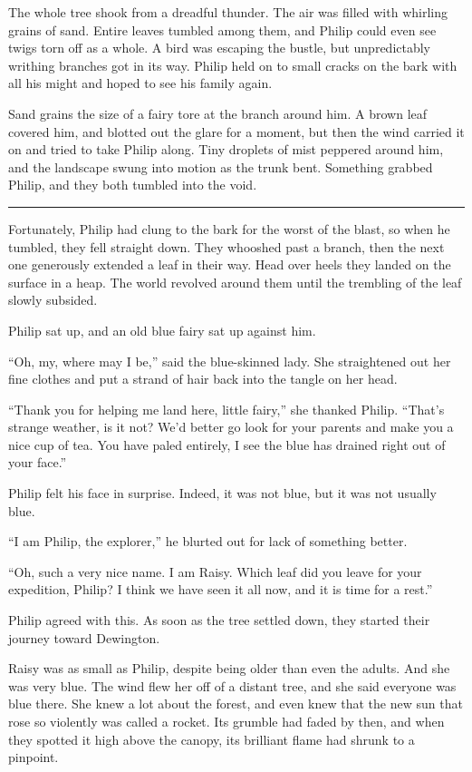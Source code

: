 \documentclass[10pt]{memoir}
\renewcommand{\pfbreakdisplay}{\bigskip \ding{166} \bigskip}
\newcommand{\secbreak}{\fancybreak{\pfbreakdisplay}}
\begin{document}
The whole tree shook from a dreadful thunder. The air was filled with whirling
grains of sand. Entire leaves tumbled among them, and Philip could even see
twigs torn off as a whole. A bird was escaping the bustle, but unpredictably
writhing branches got in its way. Philip held on to small cracks on the bark
with all his might and hoped to see his family again.

Sand grains the size of a fairy tore at the branch around him. A brown leaf
covered him, and blotted out the glare for a moment, but then the wind carried
it on and tried to take Philip along. Tiny droplets of mist peppered around
him, and the landscape swung into motion as the trunk bent. Something grabbed
Philip, and they both tumbled into the void.

\secbreak

Fortunately, Philip had clung to the bark for the worst of the blast, so when
he tumbled, they fell straight down. They whooshed past a branch, then the next
one generously extended a leaf in their way. Head over heels they landed on the
surface in a heap. The world revolved around them until the trembling of the
leaf slowly subsided.

Philip sat up, and an old blue fairy sat up against him.

``Oh, my, where may I be,'' said the blue-skinned lady. She straightened out
her fine clothes and put a strand of hair back into the tangle on her head.

``Thank you for helping me land here, little fairy,'' she thanked Philip.
``That's strange weather, is it not? We'd better go look for your parents and
make you a nice cup of tea. You have paled entirely, I see the blue has drained
right out of your face.''

Philip felt his face in surprise. Indeed, it was not blue, but it was not
usually blue.

``I am Philip, the explorer,'' he blurted out for lack of something better.

``Oh, such a very nice name. I am Raisy. Which leaf did you leave for your
expedition, Philip? I think we have seen it all now, and it is time for a
rest.''

Philip agreed with this. As soon as the tree settled down, they started their
journey toward Dewington.

Raisy was as small as Philip, despite being older than even the adults. And she
was very blue. The wind flew her off of a distant tree, and she said everyone
was blue there. She knew a lot about the forest, and even knew that the new sun
that rose so violently was called a rocket. Its grumble had faded by then, and
when they spotted it high above the canopy, its brilliant flame had shrunk to a
pinpoint.
\end{document}
